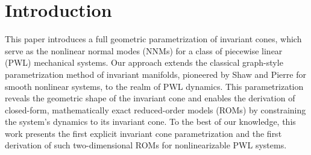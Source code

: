 \documentclass[a4paper,9pt,parskip=half,english]{article}
\theoremstyle{plain}
\theoremstyle{definition}
\begin{document}
\section{Introduction}\label{section:intro}
This paper introduces a full geometric parametrization of invariant cones, which serve as the nonlinear normal modes (NNMs) for a class of piecewise linear (PWL) mechanical systems. Our approach extends the classical graph-style parametrization method of invariant manifolds, pioneered by Shaw and Pierre \cite{Shaw1993} for smooth nonlinear systems, to the realm of PWL dynamics. This parametrization reveals the geometric shape of the invariant cone and enables the derivation of closed-form, mathematically exact reduced-order models (ROMs) by constraining the system's dynamics to its invariant cone. To the best of our knowledge, this work presents the first explicit invariant cone parametrization and the first derivation of such two-dimensional ROMs for nonlinearizable PWL systems.
\end{document}
